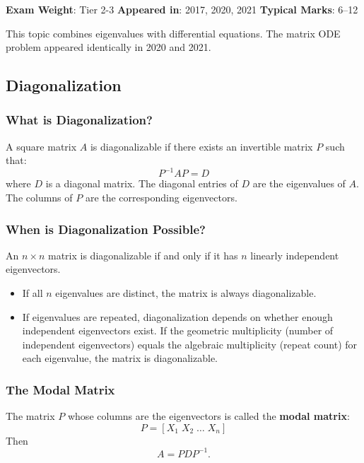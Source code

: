 \documentclass[
]{article}
\providecommand{\tightlist}{%
  \setlength{\itemsep}{0pt}\setlength{\parskip}{0pt}}
\renewenvironment{quote}
  {\begin{tcolorbox}[
     colback=calloutbg,
     colframe=calloutframe,
     colupper=callouttext,
     arc=3pt,
     boxrule=0.5pt,
     leftrule=0.5pt,
     borderline west={3pt}{0pt}{calloutaccent},
     left=8pt,
     right=8pt,
     top=6pt,
     bottom=6pt
   ]}
  {\end{tcolorbox}}
\begin{document}
\begin{quote}
\textbf{Exam Weight}: Tier 2-3 \textbar{} \textbf{Appeared in}: 2017,
2020, 2021 \textbar{} \textbf{Typical Marks}: 6--12
\end{quote}

This topic combines eigenvalues with differential equations. The matrix
ODE problem appeared identically in 2020 and 2021.

\subsection{Diagonalization}\label{diagonalization}

\subsubsection{What is Diagonalization?}\label{what-is-diagonalization}

A square matrix \(A\) is diagonalizable if there exists an invertible
matrix \(P\) such that:
\[
P^{-1}AP = D
\]
where \(D\) is a diagonal matrix. The diagonal entries of \(D\) are the
eigenvalues of \(A\). The columns of \(P\) are the corresponding
eigenvectors.

\subsubsection{When is Diagonalization
Possible?}\label{when-is-diagonalization-possible}

An \(n \times n\) matrix is diagonalizable if and only if it has \(n\)
linearly independent eigenvectors.

\begin{itemize}
\tightlist
\item
  If all \(n\) eigenvalues are distinct, the matrix is always
  diagonalizable.
\item
  If eigenvalues are repeated, diagonalization depends on whether enough
  independent eigenvectors exist. If the geometric multiplicity (number
  of independent eigenvectors) equals the algebraic multiplicity (repeat
  count) for each eigenvalue, the matrix is diagonalizable.
\end{itemize}

\subsubsection{The Modal Matrix}\label{the-modal-matrix}

The matrix \(P\) whose columns are the eigenvectors is called the
\textbf{modal matrix}:
\[
P = [X_1 \; X_2 \; \dots \; X_n]
\]
Then
\[
A = PDP^{-1}.
\]
\end{document}
